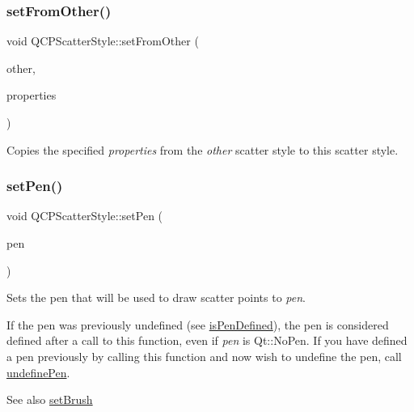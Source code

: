 \subsubsection{\texorpdfstring{set\+From\+Other()}{setFromOther()}}
{\footnotesize\ttfamily void Q\+C\+P\+Scatter\+Style\+::set\+From\+Other (\begin{DoxyParamCaption}\item[{const \hyperlink{class_q_c_p_scatter_style}{Q\+C\+P\+Scatter\+Style} \&}]{other,  }\item[{Scatter\+Properties}]{properties }\end{DoxyParamCaption})}

Copies the specified {\itshape properties} from the {\itshape other} scatter style to this scatter style. \mbox{\label{class_q_c_p_scatter_style_a761f1f229cc0ca4703e1e2b89f6dd1ba}} 
\subsubsection{\texorpdfstring{set\+Pen()}{setPen()}}
{\footnotesize\ttfamily void Q\+C\+P\+Scatter\+Style\+::set\+Pen (\begin{DoxyParamCaption}\item[{const Q\+Pen \&}]{pen }\end{DoxyParamCaption})}

Sets the pen that will be used to draw scatter points to {\itshape pen}.

If the pen was previously undefined (see \hyperlink{class_q_c_p_scatter_style_a47077eb6450fe9a788f833e4ec1b1d5a}{is\+Pen\+Defined}), the pen is considered defined after a call to this function, even if {\itshape pen} is {\ttfamily Qt\+::\+No\+Pen}. If you have defined a pen previously by calling this function and now wish to undefine the pen, call \hyperlink{class_q_c_p_scatter_style_acabc2a8c83d650b946f50c3166b6c35e}{undefine\+Pen}.

\begin{DoxySeeAlso}{See also}
\hyperlink{class_q_c_p_scatter_style_a74d692aaeb8d4b36d6f7d510e44264b1}{set\+Brush} 
\end{DoxySeeAlso}
\mbox{\label{class_q_c_p_scatter_style_a5fb611d46acfac520d7b89a1c71d9246}} 
